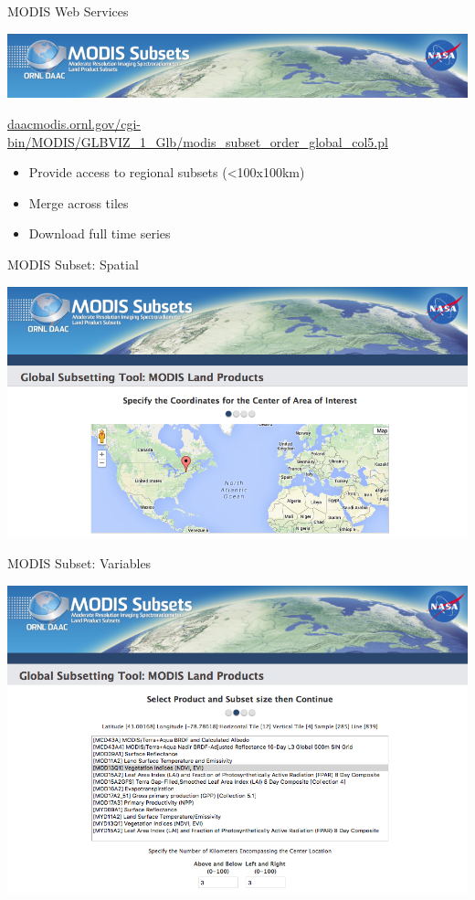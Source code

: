 \documentclass[ignorenonframetext,]{beamer}
\begin{document}
\begin{frame}{MODIS Web Services}

\includegraphics{assets/mws.png}

\href{http://daacmodis.ornl.gov/cgi-bin/MODIS/GLBVIZ_1_Glb/modis_subset_order_global_col5.pl}{daacmodis.ornl.gov/cgi-bin/MODIS/GLBVIZ\_1\_Glb/modis\_subset\_order\_global\_col5.pl}

\begin{itemize}
\itemsep1pt\parskip0pt
\item
  Provide access to regional subsets (\textless{}100x100km)
\item
  Merge across tiles
\item
  Download full time series
\end{itemize}

\end{frame}

\begin{frame}{MODIS Subset: Spatial}

\includegraphics{assets/mws0.png}

\end{frame}

\begin{frame}{MODIS Subset: Variables}

\includegraphics{assets/mws0b.png}

\end{frame}
\end{document}
